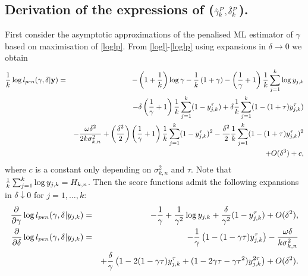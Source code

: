 \begin{subappendices}
\section{Derivation of the expressions of ($\hat{\gamma}_k^{P},\hat{\delta}_k^{P}$).} 
First consider the asymptotic approximations of the penalised ML estimator of $\gamma$ based on maximisation of \eqref{loglp}. From \eqref{logl}-\eqref{loglp} using expansions in $\delta \to 0$ 
we obtain 
\begin{eqnarray*}
	{1 \over k}\log l_{pen}(\gamma,\delta |{\bf y}) &=& 
	-\left(1+{1 \over k}\right) \log \gamma -{1 \over k}\left(1+\gamma\right) -\left(\frac{1}{\gamma}+1\right){1 \over k}\sum_{j=1}^k\log y_{j,k} \\
	&& -\delta\left({1 \over \gamma} + 1\right){1 \over k}\sum_{j=1}^k (1-y_{j,k}^{\tau})
	+ \delta {1 \over k}\sum_{j=1}^k (1- (1+\tau)y_{j,k}^{\tau})\\
	&&- {\omega \delta^2 \over 2k\sigma_{k,n}^2}
	+\left({\delta^2 \over 2}\right)\left({1  \over \gamma} +1\right){1 \over k}\sum_{j=1}^k (1-y_{j,k}^{\tau})^2
	- {\delta^2 \over 2} {1 \over k}\sum_{j=1}^k (1- (1+\tau)y_{j,k}^{\tau})^2 \\
	&&+ O(\delta^3) + c,
\end{eqnarray*}
where $c$ is a constant only depending on $\sigma_{k,n}^2$ and $\tau$. Note that ${1 \over k}\sum_{j=1}^k\log y_{j,k}=H_{k,n}$. Then the score functions admit the following expansions in $\delta \downarrow 0$ for $j=1,\ldots,k$:
\begin{eqnarray*}
	{\partial \over \partial \gamma}\log l_{pen}(\gamma,\delta |y_{j,k}) &=& -{1 \over \gamma} + {1 \over \gamma^2} \log y_{j,k}
	+{\delta \over \gamma^2}(1-y_{j,k}^{\tau})
	+ O(\delta^2), \\
	{\partial \over \partial \delta}\log l_{pen}(\gamma,\delta |y_{j,k}) &=& -{1 \over \gamma}\left( 1- (1-\gamma\tau) y_{j,k}^{\tau} \right) -{\omega\delta \over k\sigma^2_{k,n}}\\
	&&
	+ {\delta \over \gamma} \left( 1- 2(1-\gamma\tau) y_{j,k}^{\tau} 
	+ (1-2\gamma\tau-\gamma\tau^2) y_{j,k}^{2\tau}\right)+ O(\delta^2).
\end{eqnarray*}


\end{subappendices}
